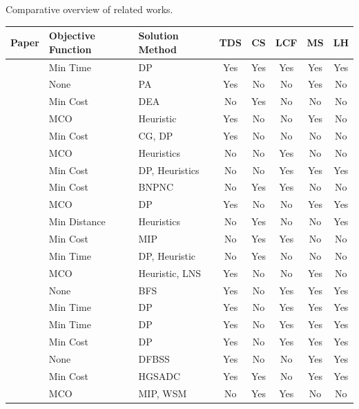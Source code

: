 \documentclass[trsc,dblanonrev]{informs4}
\begin{document}
\begin{table}
\TABLE
{Comparative overview of related works.\label{tab:Literature_Review}}
{\begin{tabular}{@{}p{7.5cm}p{2.2cm}p{3cm}ccccc@{}}
\hline\up
\textbf{Paper} & \textbf{Objective Function} & \textbf{Solution Method} & \textbf{TDS} & \textbf{CS} & \textbf{LCF} & \textbf{MS} & \textbf{LH} \\
\hline\up
\cite{xue2025routing} & Min Time & DP & Yes & Yes & Yes & Yes & Yes \\
\cite{archetti2009trip} & None & PA & Yes & No & No & Yes & No \\
\cite{barco2017optimal} & Min Cost & DEA & No & Yes & No & No & No \\
\cite{campbell2004efficient} & MCO & Heuristic & Yes & No & No & Yes & No \\
\cite{ceselli2009column} & Min Cost & CG, DP & Yes & No & No & No & No \\
\cite{conrad2011recharging} & MCO & Heuristics & No & No & Yes & No & No \\
\cite{de2022using} & Min Cost & DP, Heuristics & No & No & Yes & Yes & Yes \\
\cite{desaulniers2016exact} & Min Cost & BNPNC & No & Yes & Yes & No & No \\
\cite{drexl2010labelling} & MCO & DP & Yes & No & No & Yes & Yes \\
\cite{dolgui2024scheduling} & Min Distance & Heuristics & No & Yes & No & No & Yes \\
\cite{ferro2020optimal} & Min Cost & MIP & No & Yes & Yes & No & No \\
\cite{froger2019improved} & Min Time & DP, Heuristic & No & Yes & No & No & No \\
\cite{goel2009vehicle} & MCO & Heuristic, LNS & Yes & No & No & Yes & No \\
\cite{goel2010truck} & None & BFS & Yes & No & Yes & Yes & Yes \\
\cite{goel2012canadian} & Min Time & DP & Yes & No & Yes & Yes & Yes \\
\cite{goel2012minimum} & Min Time & DP & Yes & No & Yes & Yes & Yes \\
\cite{goel2017exact} & Min Cost & DP & Yes & No & Yes & Yes & Yes \\
\cite{goel2012efficient} & None & DFBSS & Yes & No & No & Yes & Yes \\
\cite{vidal2020concise} & Min Cost & HGSADC & Yes & Yes & No & Yes & Yes \\
\cite{grandinetti2016pick} & MCO & MIP, WSM & No & Yes & Yes & No & No \\

\end{tabular}}
\end{table}
\end{document}

